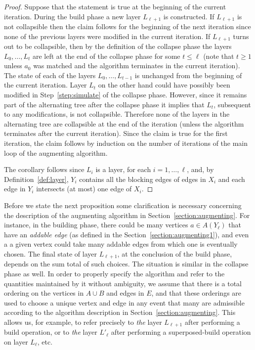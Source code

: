 \documentclass[11pt]{article}
\theoremstyle{definition}
\theoremstyle{remark}
\begin{document}
\begin{proof}
  Suppose that the statement is true at the beginning of the current
  iteration. During the build phase a new layer $L_{\ell+1}$ is
  constructed. If $L_{\ell+1}$ is not collapsible then the claim
  follows for the beginning of the next iteration since none of the
  previous layers were modified in the current iteration. If
  $L_{\ell+1}$ turns out to be collapsible, then by the definition of
  the collapse phase the layers $L_0,\dots,L_t$ are left at the end of
  the collapse phase for some $t \leq \ell$ (note that $t \geq 1$
  unless $a_0$ was matched and the algorithm terminates in the current
  iteration). The state of each of the layers $L_0,\dots,L_{t-1}$ is
  unchanged from the beginning of the current iteration. Layer $L_t$
  on the other hand could have possibly been modified in
  Step~\ref{step:simulate} of the collapse phase. However, since it
  remains part of the alternating tree after the collapse phase it
  implies that $L_t$, subsequent to any modifications, is not
  collapsible. Therefore none of the layers in the alternating tree
  are collapsible at the end of the iteration (unless the algorithm
  terminates after the current iteration). Since the claim is true for
  the first iteration, the claim follows by induction on the number of
  iterations of the main loop of the augmenting algorithm.

  The corollary follows since $L_i$ is a layer, for each
  $i=1,\dots,\ell$, and, by Definition~\ref{def:layer}, $Y_i$ contains
  all the blocking edges of edges in $X_i$ and each edge in $Y_i$
  intersects (at most) one edge of $X_i$.
\end{proof}

Before we state the next proposition some clarification is necessary
concerning the description of the augmenting algorithm in
Section~\ref{section:augmenting}. For instance, in the building phase,
there could be many vertices $a \in A(Y_\ell)$ that have an
\emph{addable edge} (as defined in the Section~\ref{section:augmenting1}), and
even a a given vertex could take many addable edges from which one is
eventually chosen. The final state of layer $L_{\ell+1}$, at the
conclusion of the build phase, depends on the sum total of such
choices. The situation is similar in the collapse phase as well. In
order to properly specify the algorithm and refer to the quantities
maintained by it without ambiguity, we assume that there is a total
ordering on the vertices in $A \cup B$ and edges in $E$, and that
these orderings are used to choose a unique vertex and edge in any
event that many are admissible according to the algorithm description
in Section~\ref{section:augmenting}. This allows us, for example, to
refer precisely to \emph{the} layer $L_{\ell + 1}$ after performing a
build operation, or to \emph{the} layer $L'_\ell$ after performing a
superposed-build operation on layer $L_\ell$, etc.
\end{document}
